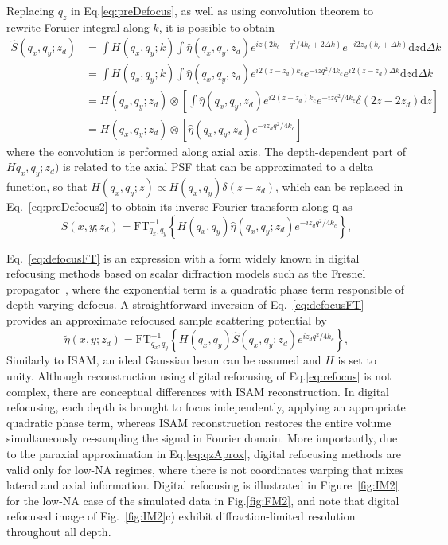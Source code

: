 Replacing $q_z$ in Eq.\eqref{eq:preDefocus}, as well as using convolution theorem to rewrite Foruier integral along $k$, it is possible to obtain
\begin{align}\label{eq:preDefocus2}
    \hat{S}(q_x,q_y; z_d) &= \int H(q_x, q_y; k) \int \hat{\eta}(q_x,q_y, z_d) e^{iz(2k_c - q^2/4k_c + 2\Delta k)} e^{-i2z_d(k_c+\Delta k)} \text{d}z\text{d}\Delta k \nonumber \\
    &= \int H(q_x, q_y; k) \int \hat{\eta}(q_x,q_y, z_d) e^{i2(z-z_d)k_c} e^{-izq^2/4k_c} e^{i2(z-z_d)\Delta k} \text{d}z\text{d}\Delta k \nonumber \\
    &= H(q_x, q_y; z_d) \otimes \left[ \int \hat{\eta}(q_x,q_y, z_d) e^{i2(z-z_d)k_c} e^{-izq^2/4k_c}  \delta(2z-2z_d) \text{d}z\right] \nonumber \\
    &= H(q_x, q_y; z_d) \otimes \left[ \hat{\eta}(q_x,q_y, z_d) e^{-iz_dq^2/4k_c}  \right]
\end{align}
where the convolution is performed along axial axis. The depth-dependent part of $Hq_x,q_y;z_d)$ is related to the axial PSF that can be approximated to a delta function, so that $H(q_x, q_y; z) \propto H(q_x, q_y)\delta(z-z_d)$, which can be replaced in Eq.~\eqref{eq:preDefocus2} to obtain its inverse Fourier transform along $\mathbf{q}$ as
\begin{equation}\label{eq:defocusFT}
    S(x, y; z_d) = \text{FT}^{-1}_{q_x, q_y}\left\{H(q_x, q_y)\hat{\eta}(q_x, q_y; z_d) e^{-iz_dq^2/4k_c}\right\},
\end{equation}

Eq.~\eqref{eq:defocusFT} is an expression with a form widely known in digital refocusing methods based on scalar diffraction models such as the Fresnel propagator~\cite{}, where the exponential term is a quadratic phase term responsible of depth-varying defocus. A straightforward inversion of Eq.~\eqref{eq:defocusFT} provides an approximate refocused sample scattering potential by
\begin{equation}\label{eq:refocus}
    \tilde{\eta}(x,y; z_d) = \text{FT}^{-1}_{q_x, q_y}\left\{H(q_x, q_y)\hat{S}(q_x, q_y; z_d) e^{iz_dq^2/4k_c}\right\},
\end{equation}
Similarly to ISAM, an ideal Gaussian beam can be assumed and $H$ is set to unity.
Although reconstruction using digital refocusing of Eq.\eqref{eq:refocus} is not complex, there are conceptual differences with ISAM reconstruction. In digital refocusing, each depth is brought to focus independently, applying an appropriate quadratic phase term, whereas ISAM reconstruction restores the entire volume simultaneously re-sampling the signal in Fourier domain. More importantly, due to the paraxial approximation in Eq.\eqref{eq:qzAprox}, digital refocusing methods are valid only for low-NA regimes, where there is not coordinates warping that mixes lateral and axial information. Digital refocusing is illustrated in Figure~\ref{fig:IM2} for the low-NA case of the simulated data in Fig.\ref{fig:FM2}, and note that digital refocused image of Fig.~\ref{fig:IM2}c) exhibit diffraction-limited resolution throughout all depth.

